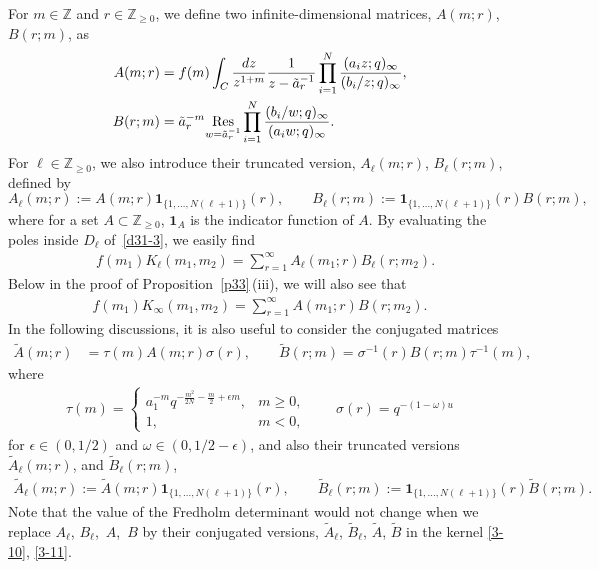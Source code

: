 \documentclass[11pt]{article}
\numberwithin{equation}{section}
\numberwithin{equation}{section}
\def\e{\epsilon}
\def\i{\infty}
\def\o{\omega}
\def\t{\tau}
\def\Z{\mathbb{Z}}
\begin{document}
For $m\in\Z$ and $r\in\Z_{\ge 0}$,
we define two infinite-dimensional matrices,
$A(m;r)$, $B(r;m)$, as
\begin{align}
 \label{3-15d}
 A(m;r)&=f(m)\int_C\frac{{\rm d}z}{z^{1+m}}
 \frac{1}{z-\tilde{a}_{r}^{-1}}
 \prod_{i=1}^N\frac{(a_i z;q)_{\i}}{(b_i/z;q)_{\i}},
 \\
 \label{3-16d}
 B(r;m)&=\tilde{a}_{r}^{-m}
 \underset{w=\tilde{a}_{r}^{-1}}{\text{Res}}
 \prod_{i=1}^N\frac{(b_i/w;q)_{\i}}{(a_i w;q)_{\i}}.
\end{align}
For $\ell\in\Z_{\ge 0}$, we also introduce their truncated version, $A_{\ell}(m;r)$, $B_{\ell}(r;m)$, defined by
\[%
 A_{\ell}(m;r):=A(m;r) \mathbf{1}_{\{1,\dots, N(\ell+1)\}}(r),\qquad
 B_{\ell}(r;m):= \mathbf{1}_{\{1,\dots, N(\ell+1)\}}(r)B(r;m),
\]
where for a set $A\subset\Z_{\ge0}$, $\mathbf{1}_A$ is the indicator function of $A$. By evaluating the poles inside $D_\ell$ of~\eqref{d31-3}, we easily find
\begin{align}
\label{3-10}
 &f(m_1)K_{\ell}(m_1,m_2)=\sum_{r=1}^{\infty}A_{\ell}(m_1;r)B_{\ell}(r;m_2).
\end{align}
Below in the proof of Proposition~\ref{p33}\,(iii), we will also see that
\begin{align}
\label{3-11}
 f(m_1)K_{\infty}(m_1,m_2)=\sum_{r=1}^{\i}A(m_1;r)B(r;m_2).
\end{align}
In the following discussions, it is also useful to consider the conjugated matrices
\begin{align}
 \label{3-16dd}
 \tilde{A}(m;r)&=\t(m) A(m;r)\sigma(r),
 \qquad
 \tilde{B}(r;m)=\sigma^{-1}(r) B(r;m)\t^{-1}(m),
\end{align}
where
\begin{align}
\label{3-12d}
 \t(m)=
 \begin{cases}
 a_{1}^{-m} q^{-\frac{m^2}{2N}-\frac{m}{2}+\e m},
 & m\ge 0,\\
 1,& m<0,
 \end{cases}
 \qquad
 \sigma(r)= q^{-(1-\omega)u}
\end{align}
for $\e\in(0,1/2)$ and $\o\in(0,1/2-\e)$, and also
their truncated versions $\tilde{A}_{\ell}(m;r)$, and
$\tilde{B}_{\ell}(r;m)$,
\begin{align}
\label{3-15at}
 \tilde{A}_{\ell}(m;r):=\tilde{A}(m;r) \mathbf{1}_{\{1,\dots, N(\ell+1)\}}(r),\qquad
 \tilde{B}_{\ell}(r;m):= \mathbf{1}_{\{1,\dots, N(\ell+1)\}}(r)\tilde{B}(r;m).
\end{align}
Note that the value of the
Fredholm determinant would not change when we replace
$A_\ell$, $B_\ell$,~$A$,~$B$ by their conjugated versions,
$\tilde{A}_\ell$, $\tilde{B}_\ell$, $\tilde{A}$, $\tilde{B}$
in the kernel \eqref{3-10}, \eqref{3-11}.
\end{document}
